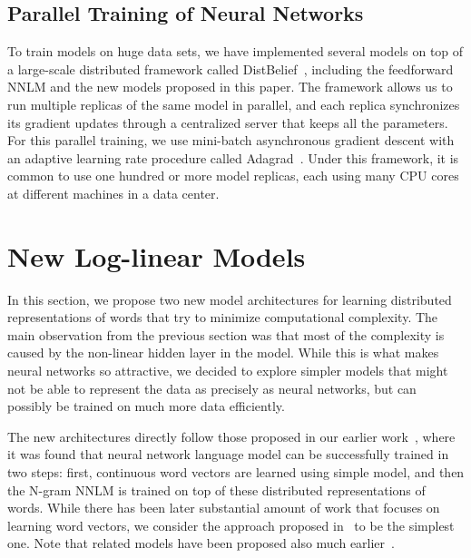 \documentclass{article} %
\begin{document}

\subsection{Parallel Training of Neural Networks}

To train models on huge data sets, we have implemented
several models on top of a large-scale distributed framework called
DistBelief~\cite{DistBelief},
including the feedforward NNLM and the new models proposed in this
paper. The framework allows us to run multiple replicas of the same
model in parallel, and each
replica synchronizes its gradient updates through a centralized
server that keeps all the parameters. For this parallel training, we
use mini-batch asynchronous
gradient descent with an adaptive
learning rate procedure called Adagrad~\cite{AdaGrad}. Under this framework, it is common to use one
hundred or more model replicas, each using many CPU cores at different machines in a data center.

\section{New Log-linear Models}



In this section, we propose two new model architectures for learning distributed representations of words that try to minimize computational complexity.
The main observation from the previous section was that most of the complexity is caused by the non-linear hidden layer in the model. While this is what makes neural networks so attractive, we decided to explore simpler models that might
not be able to represent the data as precisely as neural networks, but can possibly be trained on much more data efficiently. %

The new architectures directly follow those proposed in our earlier work~\cite{dip, Mikolov}, where it was found that neural network language model can be successfully trained in two steps: first, continuous word vectors are learned using simple
model, and then the N-gram NNLM is trained on top of these distributed representations of words. While there has been later substantial amount of work that focuses on learning word vectors, we consider the approach proposed
in~\cite{dip} to be the simplest one. Note that related models have been proposed also much earlier~\cite{BPTT, Elman}.
\end{document}
